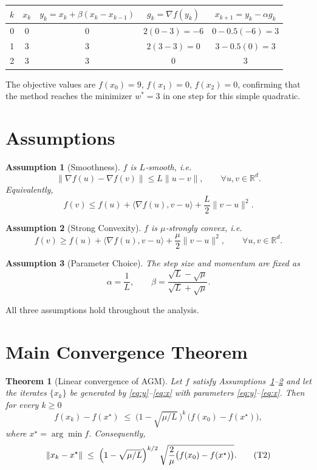 \documentclass{article}
\newtheorem{theorem}{Theorem}
\newtheorem{assumption}{Assumption}
\newcommand{\R}{\mathbb{R}}
\begin{document}
\begin{center}
\begin{tabular}{c|c|c|c|c}
$k$ & $x_{k}$ & $y_{k}=x_{k}+\beta(x_{k}-x_{k-1})$ & $g_{k}=\nabla f(y_{k})$ & $x_{k+1}=y_{k}-\alpha g_{k}$ \\ \hline
0 & $0$ & $0$ & $2(0-3)=-6$ & $0-0.5(-6)=3$ \\
1 & $3$ & $3$ & $2(3-3)=0$ & $3-0.5(0)=3$ \\
2 & $3$ & $3$ & $0$ & $3$ \\
\end{tabular}
\end{center}
The objective values are $f(x_{0})=9$, $f(x_{1})=0$, $f(x_{2})=0$, confirming that the method reaches the minimizer $w^{*}=3$ in one step for this simple quadratic.

\newpage
\section*{Assumptions}
\begin{assumption}[Smoothness]\label{ass:smooth}
$f$ is $L$‑smooth, i.e.
\[
\|\nabla f(u)-\nabla f(v)\|\le L\|u-v\|,\qquad\forall u,v\in\R^{d}.
\tag{A1}
\]
Equivalently,
\[
f(v)\le f(u)+\langle\nabla f(u),v-u\rangle+\frac{L}{2}\|v-u\|^{2}.
\tag{A1'}
\]
\end{assumption}

\begin{assumption}[Strong Convexity]\label{ass:strong}
$f$ is $\mu$‑strongly convex, i.e.
\[
f(v)\ge f(u)+\langle\nabla f(u),v-u\rangle+\frac{\mu}{2}\|v-u\|^{2},
\qquad\forall u,v\in\R^{d}.
\tag{A2}
\]
\end{assumption}

\begin{assumption}[Parameter Choice]\label{ass:param}
The step size and momentum are fixed as
\[
\alpha=\frac{1}{L},\qquad
\beta=\frac{\sqrt{L}-\sqrt{\mu}}{\sqrt{L}+\sqrt{\mu}}.
\tag{A3}
\]
\end{assumption}

All three assumptions hold throughout the analysis.

\section*{Main Convergence Theorem}
\begin{theorem}[Linear convergence of AGM]\label{thm:linear}
Let $f$ satisfy Assumptions~\ref{ass:smooth}--\ref{ass:strong} and let the iterates $\{x_{k}\}$ be generated by \eqref{eq:y}--\eqref{eq:x} with parameters \eqref{eq:y}--\eqref{eq:x}. Then for every $k\ge0$
\[
f(x_{k})-f(x^{\star})\;\le\;\bigl(1-\sqrt{\mu/L}\,\bigr)^{k}\,\bigl(f(x_{0})-f(x^{\star})\bigr),
\tag{T1}
\]
where $x^{\star}= \arg\min f$. Consequently,
\[
\|x_{k}-x^{\star}\|\;\le\;\Bigl(1-\sqrt{\mu/L}\Bigr)^{k/2}\,
\sqrt{\frac{2}{\mu}\bigl(f(x_{0})-f(x^{\star})\bigr)}.
\tag{T2}
\]
\end{theorem}
\end{document}
